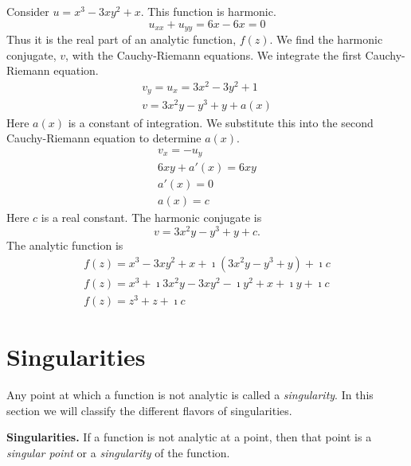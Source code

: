 \begin{Example}
  Consider $u = x^3 - 3 x y^2 + x$.  This function is harmonic.
  \[
  u_{x x} + u_{y y} = 6 x - 6 x = 0
  \]
  Thus it is the real part of an analytic function, $f(z)$.
  We find the harmonic conjugate, $v$, with the Cauchy-Riemann equations.
  We integrate the first Cauchy-Riemann equation.
  \begin{gather*}
    v_y = u_x = 3 x^2 - 3 y^2 + 1 
    \\
    v = 3 x^2 y - y^3 + y + a(x)
  \end{gather*}
  Here $a(x)$ is a constant of integration.  We substitute this into the second
  Cauchy-Riemann equation to determine $a(x)$.
  \begin{gather*}
    v_x = - u_y 
    \\
    6 x y + a'(x) = 6 x y 
    \\
    a'(x) = 0 
    \\
    a(x) = c
  \end{gather*}
  Here $c$ is a real constant.  The harmonic conjugate is
  \[
  v = 3 x^2 y - y^3 + y + c.
  \]
  The analytic function is
  \begin{gather*}
    f(z) = x^3 - 3 x y^2 + x + \imath \left( 3 x^2 y - y^3 + y \right) + \imath c 
    \\
    f(z) = x^3 + \imath 3 x^2 y - 3 x y^2 - \imath y^2 + x + \imath y + \imath c 
    \\
    f(z) = z^3 + z + \imath c
  \end{gather*}
\end{Example}








\section{Singularities}


Any point at which a function is not analytic is called a 
\textit{singularity}.
In this section we will classify the different flavors of singularities.



\begin{Result}
  \textbf{Singularities.}
  If a function is not analytic at a point, then that point is a 
  \textit{singular point} or a \textit{singularity} of the function.
\end{Result}



